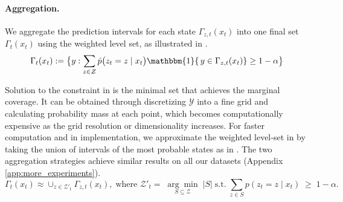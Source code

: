 \vspace{-0.5em}
\paragraph{Aggregation.} We aggregate the prediction intervals for each state $\Gamma_{z,t}(x_t)$ into one final set $\Gamma_{t}(x_t)$ using the weighted level set, as illustrated in . %
%
\begin{equation}
\Gamma_t(x_t) :=  \bigl\{ y:  \sum_{z \in \mathcal{Z}}
\hat{p}\bigl(z_t = z \mid x_t\bigr)
\mathbbm{1}\{\,y \in \Gamma_{z,t}(x_t)\} 
\geq 1 - \alpha \bigr\}
\label{eq:aggregation-average}
\end{equation}

\vspace{-0.8em}
Solution to the constraint in   is the minimal set that achieves the marginal coverage. It can be obtained through discretizing $\mathcal{Y}$ into a fine grid and calculating probability mass at each point, which becomes computationally expensive as the grid resolution or dimensionality increases. For faster computation and in implementation, we approximate the weighted level‐set in  by taking the union of intervals of the most probable states as in . The two aggregation strategies achieve similar results on all our datasets (Appendix \ref{app:more_experiments}).
%
 \begin{equation}
    \Gamma_t(x_t) \approx \cup_{z\in \mathcal{Z}'_t} \Gamma_{z,t}(x_t), \; 
    \text{where } \mathcal{Z}'_t
=\;\underset{S\subseteq\mathcal Z}{\arg\min}\;\bigl\lvert S\bigr\rvert
\;\text{s.t.}\;\sum_{z\in S}p(z_t=z\mid x_t)\;\ge\;1-\alpha.
    \label{eq:aggregation-union}
\end{equation}
%
\vspace{-1.5em}

